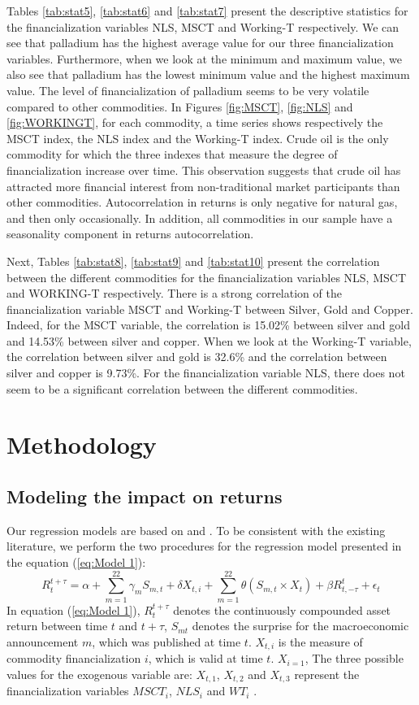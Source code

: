 \documentclass[12pt]{article}
\begin{document}
Tables \ref{tab:stat5}, \ref{tab:stat6} and \ref{tab:stat7} present the descriptive statistics for the financialization variables NLS, MSCT and Working-T respectively. We can see that palladium has the highest average value for our three financialization variables. Furthermore, when we look at the minimum and maximum value, we also see that palladium has the lowest minimum value and the highest maximum value. The level of financialization of palladium seems to be very volatile compared to other commodities. In Figures \ref{fig:MSCT}, \ref{fig:NLS} and \ref{fig:WORKINGT}, for each commodity, a time series shows respectively the MSCT index, the NLS index and the Working-T index. Crude oil is the only commodity for which the three indexes that measure the degree of financialization increase over time. This observation suggests that crude oil has attracted more financial interest from non-traditional market participants than other commodities. Autocorrelation in returns is only negative for natural gas, and then only occasionally. In addition, all commodities in our sample have a seasonality component in returns autocorrelation.
 
Next, Tables \ref{tab:stat8}, \ref{tab:stat9} and \ref{tab:stat10} present the correlation between the different commodities for the financialization variables NLS, MSCT and WORKING-T respectively. There is a strong correlation of the financialization variable MSCT and Working-T between Silver, Gold and Copper. Indeed, for the MSCT variable, the correlation is 15.02\% between silver and gold and 14.53\% between silver and copper. When we look at the Working-T variable, the correlation between silver and gold is 32.6\% and the correlation between silver and copper is 9.73\%. For the financialization variable NLS, there does not seem to be a significant correlation between the different commodities.

\section{Methodology}
\subsection{Modeling the impact on returns}\label{return}
Our regression models are based on \citet{kurov2019price} and \citet{andersen2007real}. To be consistent with the existing literature, we perform the two procedures for the regression model presented in the equation (\ref{eq:Model 1}):
\begin{equation}\label{eq:Model 1}
R_{t}^{t+\tau}=\alpha+\sum_{m=1}^{22} \gamma_m S_{m,t}+ \delta X_{t,i} + \sum_{m=1}^{22} \theta (S_{m,t} \times X_t)+\beta R_{t,-\tau}^{t}+\epsilon_{t} 
\end{equation}
In equation (\ref{eq:Model 1}), $R_{t}^{t+\tau}$ denotes the continuously compounded asset return between time $t$ and $t+\tau$, $S_{mt}$ denotes the surprise for the macroeconomic announcement $m$, which was published at time $t$. $X_{t,i}$ is the measure of commodity financialization $i$,  which is valid at time $t$. $X_{i = 1}$, The three possible values for the exogenous variable are:  $X_{t,1}$, $X_{t,2}$ and $X_{t,3}$ represent the financialization variables $MSCT_i$, $NLS_i$ and $WT_i$ . 
\end{document}
